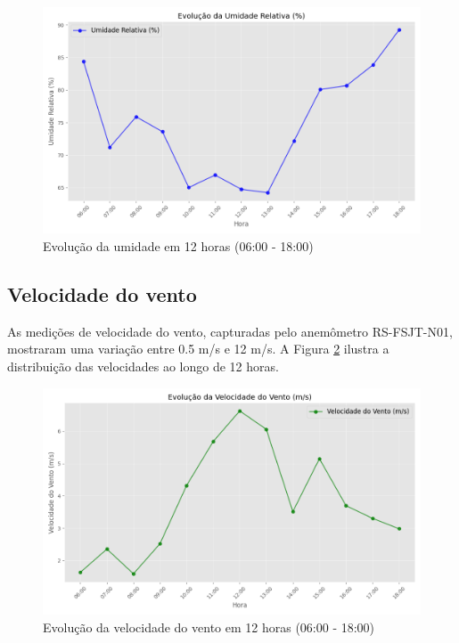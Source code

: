 \begin{figure}[!htb] \centering
  \caption{Evolução da umidade em 12 horas (06:00 - 18:00)} \label{fig:leituras-umid}
  \begin{varwidth}{\linewidth}
    \includegraphics[width=16cm]{figuras/Umidade_Relativa.png}
  \end{varwidth}
\end{figure}

\subsection{Velocidade do vento}
As medições de velocidade do vento, capturadas pelo anemômetro RS-FSJT-N01, mostraram uma variação entre 0.5 m/s e 12 m/s. A Figura \ref{fig:leituras-vel} ilustra a distribuição das velocidades ao longo de 12 horas.

\begin{figure}[!htb] \centering
  \caption{Evolução da velocidade do vento em 12 horas (06:00 - 18:00)} \label{fig:leituras-vel}
  \begin{varwidth}{\linewidth}
    \includegraphics[width=16cm]{figuras/Velocidade_do_Vento_m_s.png}
  \end{varwidth}
\end{figure}

